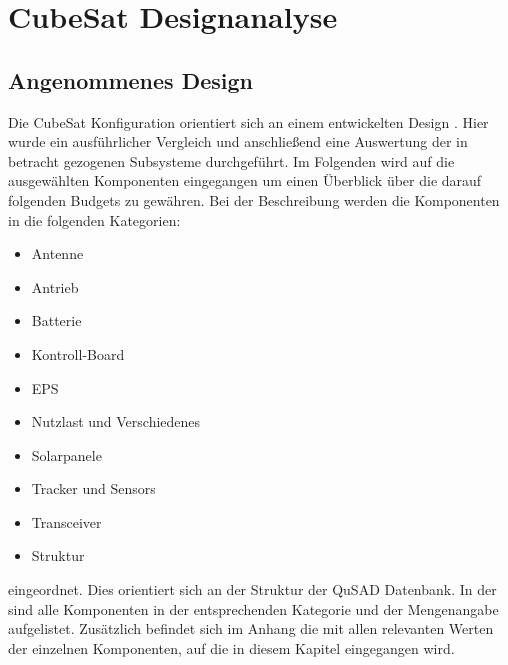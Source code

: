 		\section{CubeSat Designanalyse}
				
				\subsection{Angenommenes Design}
				
				Die CubeSat Konfiguration orientiert sich an einem entwickelten Design \cite{Lettau.}. Hier wurde ein ausführlicher Vergleich und anschließend eine Auswertung der in betracht gezogenen Subsysteme durchgeführt. Im Folgenden wird auf die ausgewählten Komponenten eingegangen um einen Überblick über die darauf folgenden Budgets zu gewähren. Bei der Beschreibung werden die Komponenten in die folgenden Kategorien: 
				\begin{itemize}
					\item Antenne
					\item Antrieb
					\item Batterie
					\item Kontroll-Board
					\item EPS
					\item Nutzlast und Verschiedenes 
					\item Solarpanele
					\item Tracker und Sensors
					\item Transceiver
					\item Struktur
				\end{itemize}
eingeordnet. Dies orientiert sich an der Struktur der QuSAD Datenbank. In der  sind alle Komponenten in der entsprechenden Kategorie und der Mengenangabe aufgelistet. Zusätzlich befindet sich im Anhang die  mit allen relevanten Werten der einzelnen Komponenten, auf die in diesem Kapitel eingegangen wird.
